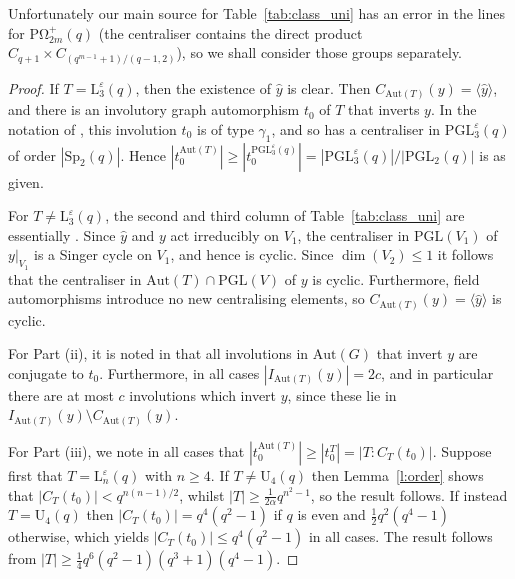 \documentclass[twoside,a4paper,reqno,11pt]{amsart}
\newcommand{\wy}{\widehat{y}}
\newcommand{\e}{\varepsilon}
\newcommand{\<}{\langle}
\renewcommand{\>}{\rangle}
\newcommand{\la}{\langle}
\newcommand{\ra}{\rangle}
\newcommand{\leqs}{\leqslant}
\newcommand{\geqs}{\geqslant}
\newcommand{\Aut}{\mathrm{Aut}}
\newcommand{\PGL}{\mathrm{PGL}}
\newcommand{\Sp}{\mathrm{Sp}}
\newcommand{\POmega}{\mathrm{P\Omega}}
\newcommand{\LL}{\mathrm{L}}
\newcommand{\UU}{\mathrm{U}}
\theoremstyle{definition}
\begin{document}
Unfortunately our main source \cite{LL_chiral} for Table~\ref{tab:class_uni} has an error in the lines for $\POmega^+_{2m}(q)$ (the centraliser contains the direct product $C_{q+1} \times C_{(q^{m-1}+1)/(q-1, 2)}$), so we shall consider those groups separately.

\begin{proof} 
If $T = \LL_3^\e(q)$, then the existence of $\wy$ is clear. 
Then 
$C_{\Aut(T)}(y) = \la \wy \ra$, and there is an involutory graph automorphism $t_0$ of $T$ that inverts $y$. In the notation of \cite[Sections 3.2.5 and 3.3.5]{BG_classical}, this involution $t_0$ is of type $\gamma_1$, and so has a centraliser in $\PGL^\e_3(q)$ of order $|\Sp_2(q)|$. 
Hence $|t_0^{\Aut(T)}| \geqs |t_0^{\PGL^{\e}_3(q)}| = |\PGL^\e_3(q)|/|\PGL_2(q)|$ 
is as given. 


For $T\ne \LL_3^\e(q)$, the second and third column of Table~\ref{tab:class_uni} are essentially \cite[Table~4]{LL_chiral}. Since $\wy$ and $y$ act irreducibly on $V_1$, the centraliser in $\PGL(V_1)$ of $y|_{V_1}$ is a Singer cycle on $V_1$, and hence is cyclic. Since $\dim(V_2) \leqs 1$ it follows that the centraliser in $\Aut(T) \cap \PGL(V)$ of $y$ is cyclic. Furthermore, field automorphisms introduce no new centralising elements, so $C_{\Aut(T)}(y) = \la \wy \ra$ is cyclic.

For Part (ii), it is noted in \cite[p. 587]{LL_chiral} that all involutions in $\Aut(G)$ that invert $y$ are conjugate to $t_0$. Furthermore, in all cases $|I_{\Aut(T)}(y)| = 2c$, and in particular there are at most $c$ involutions which invert $y$, since these  lie in $I_{\Aut(T)}(y)\setminus C_{\Aut(T)}(y)$. 

For Part (iii), we note in all cases that $|t_0^{\Aut(T)}| \geqs |t_0^T| = |T:C_T(t_0)|$. %
Suppose first that $T = \LL_n^\e(q)$ with $n \geqs 4$. %
If $T \ne \UU_4(q)$ then Lemma~\ref{l:order} shows that $|C_T(t_0)| < q^{n(n-1)/2}$, whilst $|T| \geqs \frac{1}{2\alpha}q^{n^2-1}$, so the result follows.
If instead $T = \UU_4(q)$ then $|C_T(t_0)| = q^4(q^2-1)$ if $q$ is even and $\frac{1}{2}q^2(q^4-1)$ otherwise, which yields $|C_T(t_0)|\leqs q^4(q^2-1)$ in all cases. The result follows from $|T| \geqs  \frac{1}{4}q^6(q^2-1)(q^3+1)(q^4-1)$. 


\end{proof}
\end{document}
